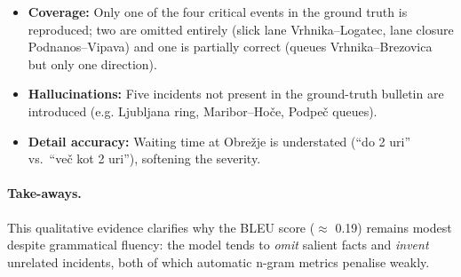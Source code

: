 \documentclass[fleqn,moreauthors,10pt]{ds_report}
\begin{document}
\begin{itemize}
  \item \textbf{Coverage:} Only one of the four critical events in the ground truth is reproduced; two are omitted entirely (slick lane Vrhnika–Logatec, lane closure Podnanos–Vipava) and one is partially correct (queues Vrhnika–Brezovica but only one direction).
  \item \textbf{Hallucinations:} Five incidents not present in the ground-truth bulletin are introduced (e.g. Ljubljana ring, Maribor–Hoče, Podpeč queues).
  \item \textbf{Detail accuracy:} Waiting time at Obrežje is understated (“do 2 uri” vs.\ “več kot 2 uri”), softening the severity.
\end{itemize}

\paragraph{Take-aways.}  
This qualitative evidence clarifies why the BLEU score ($\approx$ 0.19) remains modest despite grammatical fluency: the model tends to \emph{omit} salient facts and \emph{invent} unrelated incidents, both of which automatic n-gram metrics penalise weakly.  




\end{document}
